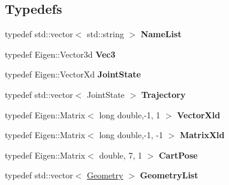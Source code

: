 \subsection*{Typedefs}
\begin{DoxyCompactItemize}
\item 
\mbox{\label{namespace_r_n_b_1_1_moveit_compact_a12d887c14238fd8fef3533b806d89395}} 
typedef std\+::vector$<$ std\+::string $>$ {\bfseries Name\+List}
\item 
\mbox{\label{namespace_r_n_b_1_1_moveit_compact_a90c8589ca6eb0324e91486d6c40f52d5}} 
typedef Eigen\+::\+Vector3d {\bfseries Vec3}
\item 
\mbox{\label{namespace_r_n_b_1_1_moveit_compact_a221b0a25f4edf59ac8f28d3d087cb9a9}} 
typedef Eigen\+::\+Vector\+Xd {\bfseries Joint\+State}
\item 
\mbox{\label{namespace_r_n_b_1_1_moveit_compact_ab55b022b32b4efe14f273a372f84f981}} 
typedef std\+::vector$<$ Joint\+State $>$ {\bfseries Trajectory}
\item 
\mbox{\label{namespace_r_n_b_1_1_moveit_compact_afa853fe0bac304883eb0fa1f0d0e4954}} 
typedef Eigen\+::\+Matrix$<$ long double,-\/1, 1 $>$ {\bfseries Vector\+Xld}
\item 
\mbox{\label{namespace_r_n_b_1_1_moveit_compact_aca60db6037e22cecf685e1fdc8afe9e9}} 
typedef Eigen\+::\+Matrix$<$ long double,-\/1, -\/1 $>$ {\bfseries Matrix\+Xld}
\item 
\mbox{\label{namespace_r_n_b_1_1_moveit_compact_ab8909dbc5dce1db70332a589ce254475}} 
typedef Eigen\+::\+Matrix$<$ double, 7, 1 $>$ {\bfseries Cart\+Pose}
\item 
\mbox{\label{namespace_r_n_b_1_1_moveit_compact_afc30435d92a67eac613a6ad79ff7d2f6}} 
typedef std\+::vector$<$ \hyperlink{struct_r_n_b_1_1_moveit_compact_1_1_geometry}{Geometry} $>$ {\bfseries Geometry\+List}
\end{DoxyCompactItemize}
